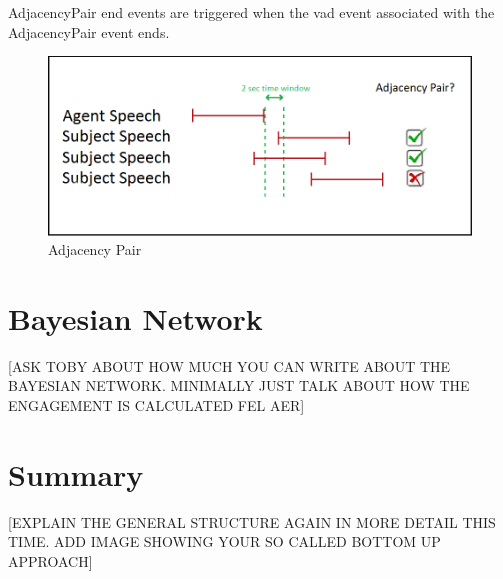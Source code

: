 \documentclass[12pt, a4paper, fleqn]{memoir}%
\begin{document}
AdjacencyPair end events are triggered when the vad event associated with the AdjacencyPair event ends.

\begin{figure}[h!]
    \centering
    \includegraphics[width=1\textwidth]{AP}
    \caption{Adjacency Pair}
    \label{fig:AdjPair_img}
\end{figure}

\chapter{Bayesian Network}
\label{chap:BayesianNetwork}
[ASK TOBY ABOUT HOW MUCH YOU CAN WRITE ABOUT THE BAYESIAN NETWORK. MINIMALLY JUST TALK ABOUT HOW THE ENGAGEMENT IS CALCULATED FEL AER]

\chapter{Summary}
\label{Summary}
[EXPLAIN THE GENERAL STRUCTURE AGAIN IN MORE DETAIL THIS TIME. ADD IMAGE SHOWING YOUR SO CALLED BOTTOM UP APPROACH]




\backmatter
\end{document}

